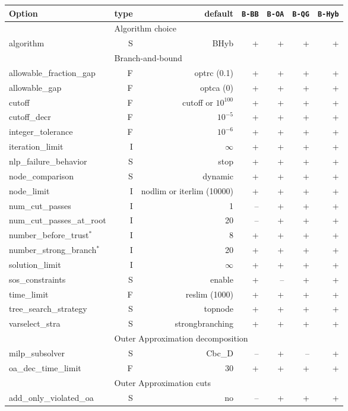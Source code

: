 \begin{center}
\begin{tabular}{|l|r|r|r|r|r|r|}\hline
Option & type &  default & {\tt B-BB} & {\tt B-OA} & {\tt B-QG} & {\tt B-Hyb} \\
\hline
\hline
\multicolumn{1}{|c}{} & \multicolumn{6}{l|}{Algorithm choice}\\
\hline
algorithm& S& B\-Hyb& +& +& +& +\\
\hline
\multicolumn{1}{|c}{} & \multicolumn{6}{l|}{Branch-and-bound}\\
\hline
allowable\_fraction\_gap& F& optrc (0.1)& +& +& +& +\\
allowable\_gap& F& optca (0)& +& +& +& +\\
cutoff& F& cutoff or $10^{100}$& +& +& +& +\\
cutoff\_decr& F& $10^{-5}$& +& +& +& +\\
integer\_tolerance& F& $10^{-6}$& +& +& +& +\\
iteration\_limit& I& $\infty$& +& +& +& +\\
nlp\_failure\_behavior& S& stop& +& +& +& +\\
node\_comparison& S& dynamic& +& +& +& +\\
node\_limit& I& nodlim or iterlim (10000)& +& +& +& +\\
num\_cut\_passes& I& 1& --& +& +& +\\
num\_cut\_passes\_at\_root& I& 20& --& +& +& +\\
number\_before\_trust$^*$& I& 8& +& +& +& +\\
number\_strong\_branch$^*$& I& 20& +& +& +& +\\
solution\_limit& I& $\infty$& +& +& +& +\\
sos\_constraints& S& enable& +& --& +& +\\
time\_limit& F& reslim (1000)& +& +& +& +\\
tree\_search\_strategy& S& top\-node& +& +& +& +\\
varselect\_stra& S& strong\-branching& +& +& +& +\\
\hline
\multicolumn{1}{|c}{} & \multicolumn{6}{l|}{Outer Approximation decomposition}\\
\hline
milp\_subsolver& S& Cbc\_D& --& +& --& +\\
oa\_dec\_time\_limit& F& 30& +& +& +& +\\
\hline
\multicolumn{1}{|c}{} & \multicolumn{6}{l|}{Outer Approximation cuts}\\
\hline
add\_only\_violated\_oa& S& no& --& +& +& +\\

\end{tabular}
\end{center}
